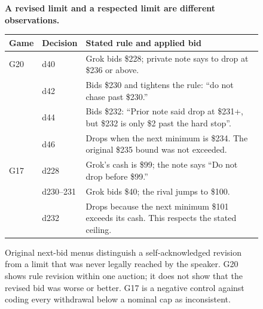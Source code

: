 \begin{figure}[H]
\centering
\begin{minipage}{0.95\linewidth}
\textbf{A revised limit and a respected limit are different observations.}\par\smallskip
\begin{tabularx}{\linewidth}{@{}llX@{}}
\toprule
Game & Decision & Stated rule and applied bid\\
\midrule
G20 & d40 & Grok bids \$228; private note says to drop at \$236 or above.\\
 & d42 & Bids \$230 and tightens the rule: ``do not chase past \$230.''\\
 & d44 & Bids \$232: ``Prior note said drop at \$231+, but \$232 is only \$2 past the hard stop''.\\
 & d46 & Drops when the next minimum is \$234. The original \$235 bound was not exceeded.\\
\midrule
G17 & d228 & Grok's cash is \$99; the note says ``Do not drop before \$99.''\\
 & d230--231 & Grok bids \$40; the rival jumps to \$100.\\
 & d232 & Drops because the next minimum \$101 exceeds its cash. This respects the stated ceiling.\\
\bottomrule
\end{tabularx}
\end{minipage}
\caption{Original next-bid menus distinguish a self-acknowledged revision from a limit that was never legally reached by the speaker. G20 shows rule revision within one auction; it does not show that the revised bid was worse or better. G17 is a negative control against coding every withdrawal below a nominal cap as inconsistent.}
\label{fig:temporal-revision}
\end{figure}
